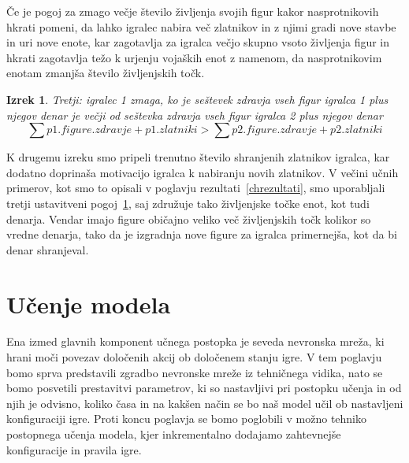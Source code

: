 \documentclass[a4paper, 12pt]{book}
\newtheorem{izrek}{Izrek}[chapter]
\begin{document}
Če je pogoj za zmago večje število življenja svojih figur kakor nasprotnikovih hkrati pomeni, da lahko igralec nabira več zlatnikov in z njimi gradi nove stavbe in uri nove enote, kar zagotavlja za igralca večjo skupno vsoto življenja figur in hkrati zagotavlja težo k urjenju vojaških enot z namenom, da nasprotnikovim enotam zmanjša število življenjskih točk.

\begin{izrek}
	\label{ustavitvenipogoj3}
Tretji: igralec 1 zmaga, ko je seštevek zdravja vseh figur igralca 1 plus njegov denar je večji od seštevka zdravja vseh figur igralca 2 plus njegov denar
	\begin{equation}
	\sum{p1.figure.zdravje} + p1.zlatniki > \sum{p2.figure.zdravje} + p2.zlatniki
	\label{eq:ustavitvenipogoj3}
	\end{equation}
\end{izrek}

K drugemu izreku smo pripeli trenutno število shranjenih zlatnikov igralca, kar dodatno doprinaša motivacijo igralca k nabiranju novih zlatnikov.
V večini učnih primerov, kot smo to opisali v poglavju rezultati~\ref{chrezultati}, smo uporabljali tretji ustavitveni pogoj~\ref{ustavitvenipogoj3}, saj združuje tako življenjske točke enot, kot tudi denarja.
Vendar imajo figure običajno veliko več življenjskih točk kolikor so vredne denarja, tako da je izgradnja nove figure za igralca primernejša, kot da bi denar shranjeval.


\chapter{Učenje modela}
\label{chucenjemodela}
Ena izmed glavnih komponent učnega postopka je seveda nevronska mreža, ki hrani moči povezav določenih akcij ob določenem stanju igre.
V tem poglavju bomo sprva predstavili zgradbo nevronske mreže iz tehničnega vidika, nato se bomo posvetili prestavitvi parametrov, ki so nastavljivi pri postopku učenja in od njih je odvisno, koliko časa in na kakšen način se bo naš model učil ob nastavljeni konfiguraciji igre.
Proti koncu poglavja se bomo poglobili v možno tehniko postopnega učenja modela, kjer inkrementalno dodajamo zahtevnejše konfiguracije in pravila igre.
\end{document}

